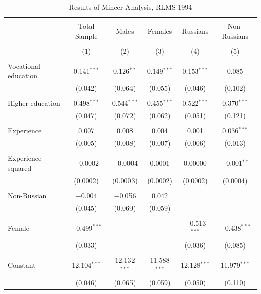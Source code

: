 \documentclass[12pt,a4paper]{article}
\begin{document}
\begin{table}[!htbp] \centering 
  \caption{Results of Mincer Analysis, RLMS 1994} 
  \label{} 
\begin{tabular}{@{\extracolsep{5pt}}lccccc} 
\\[-1.8ex]\hline 
\hline \\[-1.8ex] 
 & Total Sample & Males & Females & Russians & Non-Russians \\ 
\\[-1.8ex] & (1) & (2) & (3) & (4) & (5)\\ 
\hline \\[-1.8ex] 
 Vocational education & 0.141$^{***}$ & 0.126$^{**}$ & 0.149$^{***}$ & 0.153$^{***}$ & 0.085 \\ 
  & (0.042) & (0.064) & (0.055) & (0.046) & (0.102) \\ 
  & & & & & \\ 
 Higher education & 0.498$^{***}$ & 0.544$^{***}$ & 0.455$^{***}$ & 0.522$^{***}$ & 0.370$^{***}$ \\ 
  & (0.047) & (0.072) & (0.062) & (0.051) & (0.121) \\ 
  & & & & & \\ 
 Experience & 0.007 & 0.008 & 0.004 & 0.001 & 0.036$^{***}$ \\ 
  & (0.005) & (0.008) & (0.007) & (0.006) & (0.013) \\ 
  & & & & & \\ 
 Experience squared & $-$0.0002 & $-$0.0004 & 0.0001 & 0.00000 & $-$0.001$^{**}$ \\ 
  & (0.0002) & (0.0003) & (0.0002) & (0.0002) & (0.0004) \\ 
  & & & & & \\ 
 Non-Russian & $-$0.004 & $-$0.056 & 0.042 &  &  \\ 
  & (0.045) & (0.069) & (0.059) &  &  \\ 
  & & & & & \\ 
 Female & $-$0.499$^{***}$ &  &  & $-$0.513$^{***}$ & $-$0.438$^{***}$ \\ 
  & (0.033) &  &  & (0.036) & (0.085) \\ 
  & & & & & \\ 
 Constant & 12.104$^{***}$ & 12.132$^{***}$ & 11.588$^{***}$ & 12.128$^{***}$ & 11.979$^{***}$ \\ 
  & (0.046) & (0.065) & (0.059) & (0.050) & (0.110) \\ 

\end{tabular}
\end{table}
\end{document}

